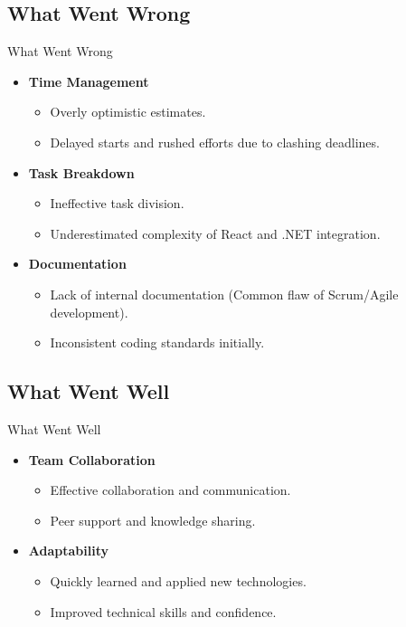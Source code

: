 \documentclass{beamer}
\begin{document}
\subsection{What Went Wrong}
\begin{frame}{What Went Wrong}
    \begin{itemize}
        \item \textbf{Time Management}
        \begin{itemize}
            \item Overly optimistic estimates.
            \item Delayed starts and rushed efforts due to clashing deadlines.
        \end{itemize}
        \item \textbf{Task Breakdown}
        \begin{itemize}
            \item Ineffective task division.
            \item Underestimated complexity of React and .NET integration.
        \end{itemize}
        \item \textbf{Documentation}
        \begin{itemize}
            \item Lack of internal documentation (Common flaw of Scrum/Agile development).
            \item Inconsistent coding standards initially.
        \end{itemize}
    \end{itemize}
\end{frame}

\subsection{What Went Well}
\begin{frame}{What Went Well}
    \begin{itemize}
        \item \textbf{Team Collaboration}
        \begin{itemize}
            \item Effective collaboration and communication.
            \item Peer support and knowledge sharing.
        \end{itemize}
        \item \textbf{Adaptability}
        \begin{itemize}
            \item Quickly learned and applied new technologies.
            \item Improved technical skills and confidence.
        \end{itemize}
    \end{itemize}
\end{frame}
\end{document}
